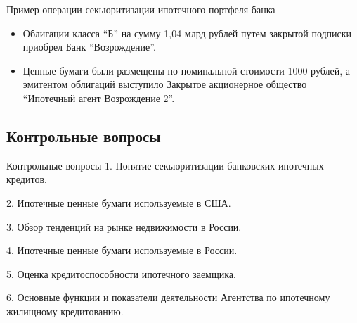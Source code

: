 \documentclass[_Banking_p2.tex]{subfiles}
\begin{document}
\begin{frame}{Пример операции секьюритизации ипотечного портфеля банка}
\begin{itemize}[<+->]
\item
Облигации класса ``Б'' на сумму 1,04 млрд рублей путем закрытой подписки приобрел Банк ``Возрождение''. 
\item
Ценные бумаги были размещены по номинальной стоимости 1000 рублей, а эмитентом облигаций выступило Закрытое акционерное общество ``Ипотечный агент Возрождение 2''.
\end{itemize}
\end{frame}

\subsection{Контрольные вопросы}
\begin{frame}{Контрольные вопросы}
1. Понятие секьюритизации банковских ипотечных кредитов.

2. Ипотечные ценные бумаги используемые в США.

3. Обзор тенденций на рынке недвижимости в России.

4. Ипотечные ценные бумаги используемые в России.

5. Оценка кредитоспособности ипотечного заемщика.

6. Основные функции и показатели деятельности Агентства по ипотечному жилищному кредитованию.
\end{frame}

\end{document}
